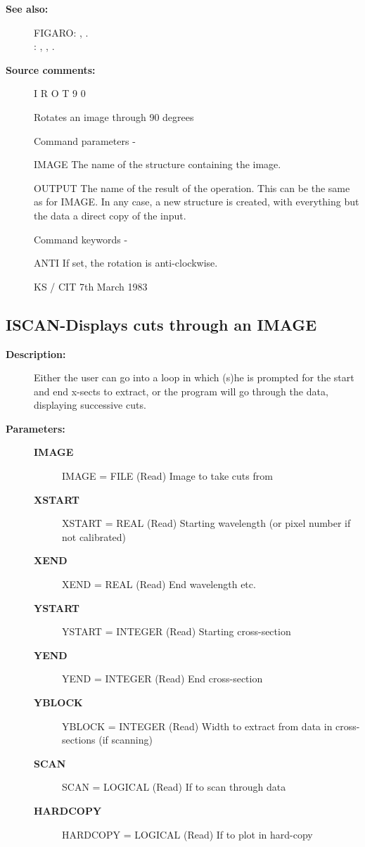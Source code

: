 \begin{description}
\begin{description}
\item [\textbf{See also:}]
FIGARO: , .\\
: , , .\\

\item [\textbf{Source comments:}]
\begin{terminalv}
 I R O T 9 0

 Rotates an image through 90 degrees

 Command parameters -

 IMAGE  The name of the structure containing the image.

 OUTPUT The name of the result of the operation.  This can
        be the same as for IMAGE.  In any case, a new structure
        is created, with everything but the data a direct
        copy of the input.

 Command keywords -

 ANTI   If set, the rotation is anti-clockwise.

                                  KS / CIT 7th March 1983
\end{terminalv}
\end{description}
\subsection{ISCAN-\label{ISCAN}Displays cuts through an IMAGE }
\begin{description}

\item [\textbf{Description:}]
   Either the user can go into a loop in which (s)he is prompted for
   the start and end x-sects to extract, or the program will go through
   the data, displaying successive cuts.

\item [\textbf{Parameters:}]
\begin{description}
\item [\textbf{IMAGE}]
    IMAGE = FILE (Read)
        Image to take cuts from
\item [\textbf{XSTART}]
    XSTART = REAL (Read)
        Starting wavelength (or pixel number if not calibrated)
\item [\textbf{XEND}]
    XEND = REAL (Read)
        End wavelength etc.
\item [\textbf{YSTART}]
    YSTART = INTEGER (Read)
        Starting cross-section
\item [\textbf{YEND}]
    YEND = INTEGER (Read)
        End cross-section
\item [\textbf{YBLOCK}]
    YBLOCK = INTEGER (Read)
        Width to extract from data in cross-sections (if scanning)
\item [\textbf{SCAN}]
    SCAN = LOGICAL (Read)
        If to scan through data
\item [\textbf{HARDCOPY}]
    HARDCOPY = LOGICAL (Read)
        If to plot in hard-copy
\end{description}


\end{description}
\end{description}
